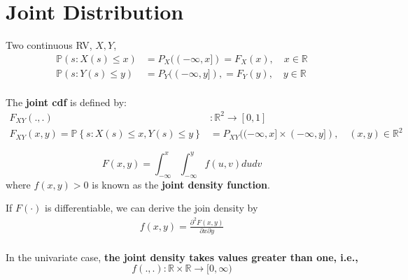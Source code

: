 \documentclass[12pt]{article}
\begin{document}
\section{Joint Distribution}
Two continuous RV, $ X, Y $,
\begin{align*}
		\mathbb{P}(s:X(s) \le x) &= P_{X}(( - \infty , x]) = F_{X}(x), \quad x \in \mathbb{R}\\
		\mathbb{P}(s:Y(s) \le y) &= P_{Y}(( - \infty , y]),= F_{Y}(y), \quad  y \in \mathbb{R}\\
\end{align*}

The {\textbf {joint cdf}} is defined by:
\begin{align*}
		F_{XY}(.,.)&: \mathbb{R}^{2} \rightarrow [0,1]\\
		F_{XY}(x,y) = \mathbb{P}\left\{ s:X(s) \le x, Y(s) \le y \right\} &= P_{XY}(
		( - \infty ,x] \times ( - \infty , y]), \quad (x,y) \in \mathbb{R}^{2}
\end{align*}

\begin{equation*}
F(x,y) = \int_{ - \infty }^{x}\int_{ - \infty }^{y} f(u,v)du dv 
\end{equation*}
where $ f(x,y) > 0 $ is known as the {\textbf {joint density function}}.

If $ F(\cdot ) $ is differentiable, we can derive the join density by
\begin{align*}
f(x,y) = \frac{\partial^{2}F(x,y)  }{\partial x \partial y }
\end{align*}
\noindent{}\\

In the univariate case, {\textbf {the joint density takes values greater than one,
i.e., }}
\begin{equation*}
		f(.,.) : \mathbb{R} \times \mathbb{R} \rightarrow [0, \infty )
\end{equation*}
\end{document}
